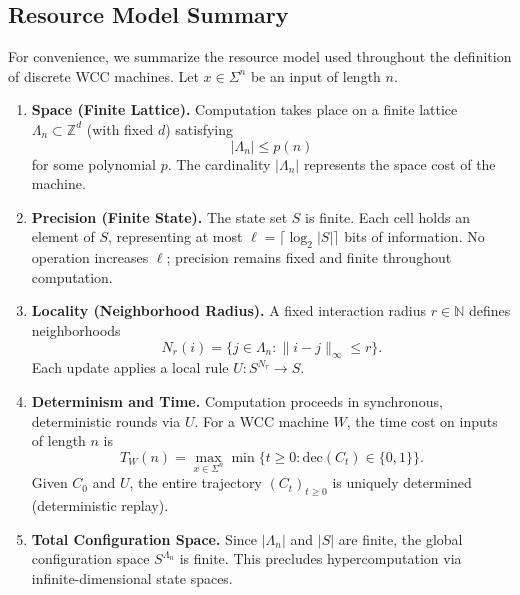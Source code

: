 \documentclass[12pt]{article}
\begin{document}

\subsection{Resource Model Summary}

For convenience, we summarize the resource model used throughout the
definition of discrete WCC machines. Let $x \in \Sigma^n$ be an
input of length $n$.

\begin{enumerate}

    \item \textbf{Space (Finite Lattice).}
    Computation takes place on a finite lattice
    $\Lambda_n \subset \mathbb{Z}^d$ (with fixed $d$) satisfying
    \[
        |\Lambda_n| \le p(n)
    \]
    for some polynomial $p$. The cardinality $|\Lambda_n|$ represents
    the space cost of the machine.

    \item \textbf{Precision (Finite State).}
    The state set $S$ is finite. Each cell holds an element of $S$,
    representing at most $\ell = \lceil\log_2|S|\rceil$ bits of information.
    No operation increases $\ell$; precision remains fixed and finite
    throughout computation.

    \item \textbf{Locality (Neighborhood Radius).}
    A fixed interaction radius $r \in \mathbb{N}$ defines neighborhoods
    \[
        N_r(i) = \{ j \in \Lambda_n : \|i-j\|_\infty \le r \}.
    \]
    Each update applies a local rule $U : S^{N_r} \to S$.

    \item \textbf{Determinism and Time.}
    Computation proceeds in synchronous, deterministic rounds via $U$.
    For a WCC machine $W$, the time cost on inputs of length $n$ is
    \[
        T_W(n) =
        \max_{x \in \Sigma^n}
        \min\{ t\ge0 : \mathrm{dec}(C_t) \in \{0,1\}\}.
    \]
    Given $C_0$ and $U$, the entire trajectory $(C_t)_{t \ge 0}$ is uniquely
    determined (deterministic replay).

    \item \textbf{Total Configuration Space.}
    Since $|\Lambda_n|$ and $|S|$ are finite,
    the global configuration space $S^{\Lambda_n}$ is finite.
    This precludes hypercomputation via infinite-dimensional state spaces.

\end{enumerate}
\end{document}
